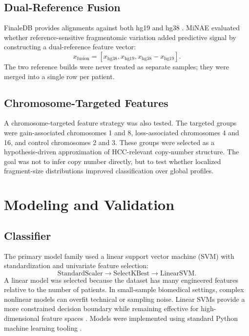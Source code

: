 \documentclass[conference]{IEEEtran}
\begin{document}
\subsection{Dual-Reference Fusion}
FinaleDB provides alignments against both hg19 and hg38 \cite{zheng2021finaledb}. MiNAE evaluated whether reference-sensitive fragmentomic variation added predictive signal by constructing a dual-reference feature vector:
\begin{equation}
    x_{\mathrm{fusion}} = [x_{\mathrm{hg38}}, x_{\mathrm{hg19}}, x_{\mathrm{hg38}} - x_{\mathrm{hg19}}].
\end{equation}
The two reference builds were never treated as separate samples; they were merged into a single row per patient.

\subsection{Chromosome-Targeted Features}
A chromosome-targeted feature strategy was also tested. The targeted groups were gain-associated chromosomes 1 and 8, loss-associated chromosomes 4 and 16, and control chromosomes 2 and 3. These groups were selected as a hypothesis-driven approximation of HCC-relevant copy-number structure. The goal was not to infer copy number directly, but to test whether localized fragment-size distributions improved classification over global profiles.

\section{Modeling and Validation}
\subsection{Classifier}
The primary model family used a linear support vector machine (SVM) with standardization and univariate feature selection:
\begin{equation}
    \mathrm{StandardScaler} \rightarrow \mathrm{SelectKBest} \rightarrow \mathrm{LinearSVM}.
\end{equation}
A linear model was selected because the dataset has many engineered features relative to the number of patients. In small-sample biomedical settings, complex nonlinear models can overfit technical or sampling noise. Linear SVMs provide a more constrained decision boundary while remaining effective for high-dimensional feature spaces \cite{cortes1995support}. Models were implemented using standard Python machine learning tooling \cite{pedregosa2011scikit}.
\end{document}

